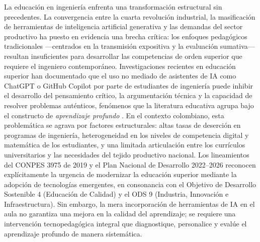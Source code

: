 

La educación en ingeniería enfrenta una transformación estructural sin precedentes. La
convergencia entre la cuarta revolución industrial, la masificación de herramientas de
inteligencia artificial generativa y las demandas del sector productivo ha puesto en
evidencia una brecha crítica: los enfoques pedagógicos tradicionales —centrados en la
transmisión expositiva y la evaluación sumativa— resultan insuficientes para desarrollar
las competencias de orden superior que requiere el ingeniero contemporáneo. Investigaciones
recientes en educación superior han documentado que el uso no mediado de asistentes de IA
como ChatGPT o GitHub Copilot por parte de estudiantes de ingeniería puede inhibir el
desarrollo del pensamiento crítico, la argumentación técnica y la capacidad de resolver
problemas auténticos, fenómenos que la literatura educativa agrupa bajo el constructo de
\emph{aprendizaje profundo} \cite{zawacki2019systematic, holmes2022state}. En el
contexto colombiano, esta problemática se agrava por factores estructurales: altas tasas de
deserción en programas de ingeniería, heterogeneidad en los niveles de competencia digital
y matemática de los estudiantes, y una limitada articulación entre los currículos
universitarios y las necesidades del tejido productivo nacional. Los lineamientos del
CONPES 3975 de 2019 y el Plan Nacional de Desarrollo 2022--2026 reconocen explícitamente
la urgencia de modernizar la educación superior mediante la adopción de tecnologías
emergentes, en consonancia con el Objetivo de Desarrollo Sostenible 4 (Educación de
Calidad) y el ODS 9 (Industria, Innovación e Infraestructura). Sin embargo, la mera
incorporación de herramientas de IA en el aula no garantiza una mejora en la calidad del
aprendizaje; se requiere una intervención tecnopedagógica integral que diagnostique,
personalice y evalúe el aprendizaje profundo de manera sistemática.


